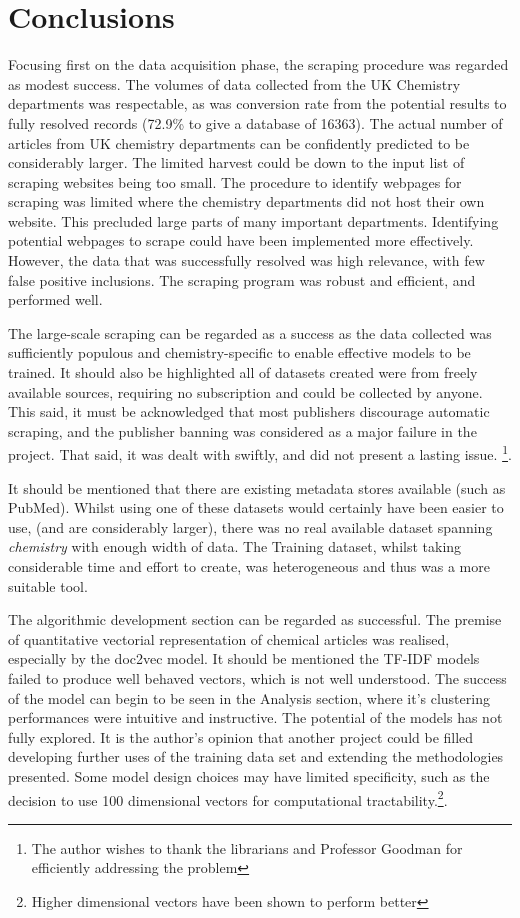 \chapter{Conclusions}
Focusing first on the data acquisition phase, the scraping procedure was regarded as modest success. The volumes of data collected from the UK Chemistry departments was respectable, as was conversion rate from the potential results to fully resolved records (72.9\%  to give a database of 16363). The actual number of articles from UK chemistry departments can be confidently predicted to be considerably larger. The limited harvest could be down to the input list of scraping websites being too small. The procedure to identify webpages for scraping was limited where the chemistry departments did not host their own website. This  precluded large parts of many important departments. Identifying potential webpages to scrape could have been implemented more effectively.  However, the data that was successfully resolved was high relevance, with few false positive inclusions. The scraping program was robust and efficient, and performed well. 

The large-scale scraping can be regarded as a success as the data collected was sufficiently populous and chemistry-specific  to enable effective models to be trained. It should also be highlighted all of datasets created were from freely available sources, requiring no subscription and could be collected by anyone. This said, it must be acknowledged that most publishers discourage automatic scraping, and the publisher banning was considered as a major failure in the project. That said, it was dealt with swiftly, and did not present a lasting issue. \footnote{The author wishes to thank the librarians and Professor Goodman for efficiently addressing the problem}.

 It should be mentioned that there are existing metadata stores available (such as PubMed). Whilst using one of these datasets would certainly have been easier to use, (and  are considerably larger), there was no real available dataset spanning \emph{chemistry} with enough width of data. The Training dataset, whilst taking considerable time and effort to create, was heterogeneous and thus was a more suitable tool.

The algorithmic development section can be regarded as successful. The premise of quantitative vectorial representation of chemical articles was realised, especially by the doc2vec model. It should be mentioned the TF-IDF models failed to produce well behaved vectors, which is not well understood. The success of the model can begin to be seen in the Analysis section, where it's clustering performances were intuitive and instructive. The potential of the models has not fully explored. It is the author's opinion that another project could be filled developing further uses of the training data set and extending the methodologies presented. 
Some model design choices may have limited specificity, such as the decision to use 100 dimensional vectors for computational tractability.\footnote{Higher dimensional vectors have been shown to perform better}.

